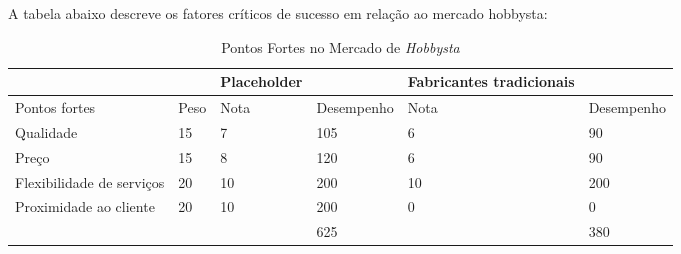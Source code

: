 A tabela abaixo descreve os fatores críticos de sucesso em relação ao mercado hobbysta:

\begin{table}[!htbp]
	\centering

	\begin{tabular}{ll|l|l|l|l|}
		\cline{3-3} \cline{5-6}
														& \multicolumn{1}{l|}{}     & Placeholder &            & Fabricantes tradicionais &            \\ \hline
		\multicolumn{1}{|l|}{Pontos fortes}             & \multicolumn{1}{l|}{Peso} & Nota        & Desempenho & Nota                     & Desempenho \\ \hline
		\multicolumn{1}{|l|}{Qualidade}                 & \multicolumn{1}{l|}{15}   & 7           & 105        & 6                        & 90         \\ \hline
		\multicolumn{1}{|l|}{Preço}                     & \multicolumn{1}{l|}{15}   & 8           & 120        & 6                        & 90         \\ \hline
		\multicolumn{1}{|l|}{Flexibilidade de serviços} & \multicolumn{1}{l|}{20}   & 10          & 200        & 10                       & 200        \\ \hline
		\multicolumn{1}{|l|}{Proximidade ao cliente}    & \multicolumn{1}{l|}{20}   & 10          & 200        & 0                        & 0          \\ \hline
														&                           &             & 625        &                          & 380        \\ \cline{4-4} \cline{6-6} 
	\end{tabular}
	\label{pontoForteHobby}
	\caption{Pontos Fortes no Mercado de \emph{Hobbysta}}
\end{table}

